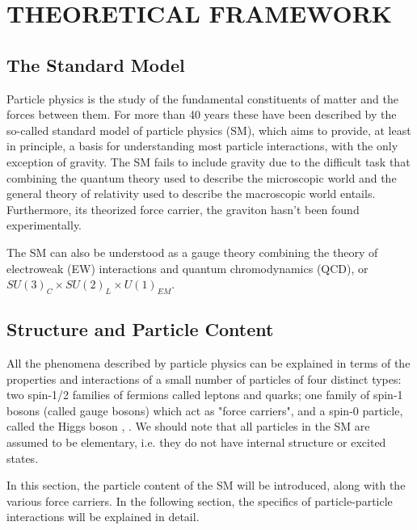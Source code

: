 %
%
%
%



\chapter{THEORETICAL FRAMEWORK}
\section{The Standard Model}
Particle physics is the study of the fundamental constituents of matter and the forces between them. For more than 40 years these have been described by the so-called standard model of particle physics (SM), which aims to provide, at least in principle, a basis for understanding most particle interactions, with the only exception of gravity. The SM fails to include gravity due to the difficult task that combining the quantum theory used to describe the microscopic world and the general theory of relativity used to describe the macroscopic world entails. Furthermore, its theorized force carrier, the graviton hasn't been found experimentally.

The SM can also be understood as a gauge theory combining the theory of electroweak (EW) interactions and quantum chromodynamics (QCD), or $SU(3)_{C}\times SU(2)_{L} \times U(1)_{EM}$. 

\section{Structure and Particle Content}
All the phenomena described by particle physics can be explained in terms of the properties and interactions of a small number of particles of four distinct types: two spin-1/2 families of fermions called leptons and quarks; one family of spin-1 bosons (called gauge bosons) which act as "force carriers", and a spin-0 particle, called the Higgs boson \cite{20121}, \cite{201230}. We should note that all particles in the SM are assumed to be elementary, i.e. they do not have internal structure or excited states.

In this section, the particle content of the SM will be introduced, along with the various force carriers. In the following section, the specifics of particle-particle interactions will be explained in detail.

